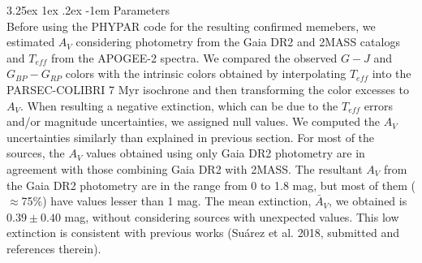 \documentclass[12pt]{article}
\makeatletter
\renewcommand\paragraph{\@startsection{paragraph}{5}{\z@}%
  {3.25ex \@plus1ex \@minus.2ex}%
  {-1em}%
  {\normalfont\normalsize\bfseries}}
\makeatother
\begin{document}
\paragraph{Parameters\\}
\label{sec_APOGEE-2:parameters}
Before using the PHYPAR code for the resulting confirmed memebers, we estimated $A_V$ considering photometry from the Gaia DR2 and 2MASS catalogs and $T_{eff}$ from the APOGEE-2 spectra. We compared the observed $G-J$ and $G_{BP}-G_{RP}$ colors with the intrinsic colors obtained by interpolating $T_{eff}$ into the PARSEC-COLIBRI 7 Myr isochrone and then transforming the color excesses to $A_V$. When resulting a negative extinction, which can be due to the $T_{eff}$ errors and/or magnitude uncertainties, we assigned null values. We computed the $A_V$ uncertainties similarly than explained in previous section. For most of the sources, the $A_V$ values obtained using only Gaia DR2 photometry are in agreement with those combining Gaia DR2 with 2MASS. The resultant $A_V$ from the Gaia DR2 photometry are in the range from 0 to 1.8 mag, but most of them ($\approx$75\%) have values lesser than 1 mag. The mean extinction, $\bar{A}_V$, we obtained is $0.39\pm0.40$ mag, without considering sources with unexpected values. This low extinction is consistent with previous works (Su\'arez et al. 2018, submitted and references therein).

\end{document}
